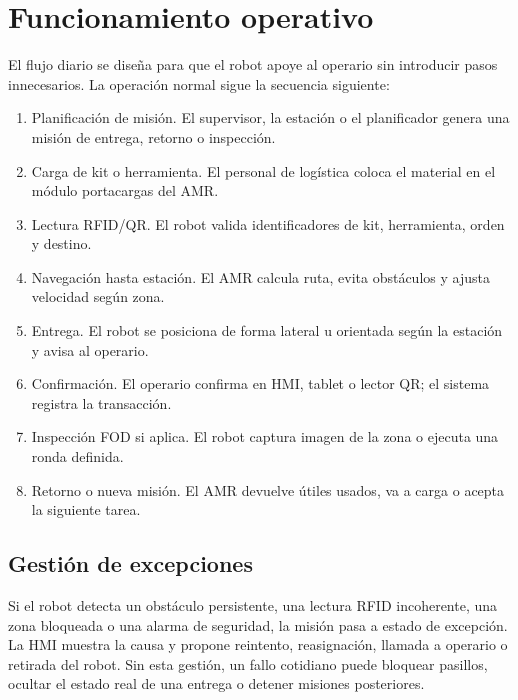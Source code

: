 \chapter{Funcionamiento operativo}

El flujo diario se diseña para que el robot apoye al operario sin introducir pasos innecesarios. La operación normal sigue la secuencia siguiente:

\begin{enumerate}
  \item Planificación de misión. El supervisor, la estación o el planificador genera una misión de entrega, retorno o inspección.
  \item Carga de kit o herramienta. El personal de logística coloca el material en el módulo portacargas del AMR.
  \item Lectura RFID/QR. El robot valida identificadores de kit, herramienta, orden y destino.
  \item Navegación hasta estación. El AMR calcula ruta, evita obstáculos y ajusta velocidad según zona.
  \item Entrega. El robot se posiciona de forma lateral u orientada según la estación y avisa al operario.
  \item Confirmación. El operario confirma en HMI, tablet o lector QR; el sistema registra la transacción.
  \item Inspección FOD si aplica. El robot captura imagen de la zona o ejecuta una ronda definida.
  \item Retorno o nueva misión. El AMR devuelve útiles usados, va a carga o acepta la siguiente tarea.
\end{enumerate}

\section{Gestión de excepciones}

Si el robot detecta un obstáculo persistente, una lectura RFID incoherente, una zona bloqueada o una alarma de seguridad, la misión pasa a estado de excepción. La HMI muestra la causa y propone reintento, reasignación, llamada a operario o retirada del robot. Sin esta gestión, un fallo cotidiano puede bloquear pasillos, ocultar el estado real de una entrega o detener misiones posteriores.

